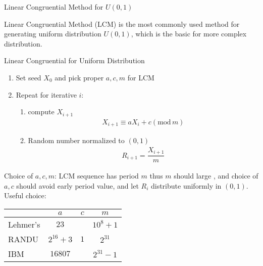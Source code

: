 \begin{point}
    Linear Congruential Method for $ U(0,1) $\hypertarget{StatisticalSimulationLCM}{}
\end{point}

    Linear Congruential Method (LCM) is the most commonly used method for generating uniform distribution $ U(0,1) $, which is the basic for more complex distribution. 


\begin{algorithm}{Linear Congruential for Uniform Distribution}
    
\begin{enumerate}[topsep=2pt,itemsep=2pt]
    \item Set seed $ X_0 $ and pick proper $ a,c,m $ for LCM
    \item Repeat for iterative $ i $:
    \begin{enumerate}[topsep=2pt,itemsep=2pt]
        \item compute $ X_{i+1} $
\begin{align}
    X_{i+1}\equiv aX_i+c(\mathrm{mod}\,m )
\end{align}
    \item Random number normalized to $ (0,1) $
    \begin{align}
        R_{i+1}=\dfrac{X_{i+1}}{m} 
    \end{align}
    \end{enumerate}
\end{enumerate}
\end{algorithm}
    
    


    Choice of $ a,c,m $: LCM sequence has period $ m $ thus $ m $ should large , and choice of $ a,c $ should avoid early period value, and let $ R_i $ distribute uniformly in $ (0,1) $. Useful choice:
        \begin{table}[H]
            \centering
            \renewcommand\arraystretch{1.15}
            \begin{tabular}{lccc}
                \hline
                &$ a $&$ c $&$ m $\\
                \hline
                Lehmer's&$ 23 $&&$ 10^8+1 $\\
                RANDU&$ 2^{16}+3 $&$ 1 $&$ 2^{31} $\\
                IBM&$ 16807 $&&$ 2^{31}-1 $\\
                \hline
            \end{tabular}
            \label{}
        \end{table}
        

